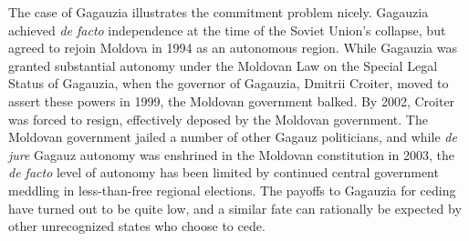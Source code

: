 \documentclass[11pt,letterpaper, notitlepage]{article}
\begin{document}

The case of Gagauzia illustrates the commitment problem nicely. Gagauzia achieved \emph{de facto} independence at the time of the Soviet Union's collapse, but agreed to rejoin Moldova in 1994 as an autonomous region. While Gagauzia was granted substantial autonomy under the Moldovan Law on the Special Legal Status of Gagauzia, when the governor of Gagauzia, Dmitrii Croiter, moved to assert these powers in 1999, the Moldovan government balked. By 2002, Croiter was forced to resign, effectively deposed by the Moldovan government. The Moldovan government jailed a number of other Gagauz politicians, and while \emph{de jure} Gagauz autonomy was enshrined in the Moldovan constitution in 2003, the \emph{de facto} level of autonomy has been limited by continued central government meddling in less-than-free regional elections. The payoffs to Gagauzia for ceding have turned out to be quite low, and a similar fate can rationally be expected by other unrecognized states who choose to cede.


\end{document}
